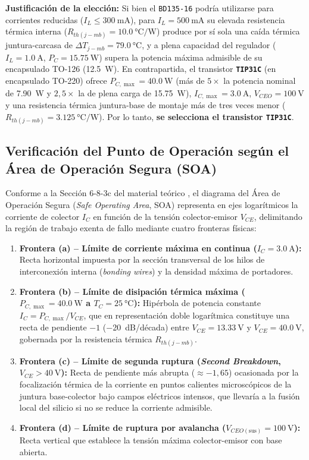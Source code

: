 \textbf{Justificación de la elección:} Si bien el \texttt{BD135-16} podría utilizarse para corrientes reducidas ($I_L \le \SI{300}{\milli\ampere}$), para $I_L = \SI{500}{\milli\ampere}$ su elevada resistencia térmica interna ($R_{th(j-mb)} = \SI{10,0}{\celsius\per\watt}$) produce por sí sola una caída térmica juntura-carcasa de $\Delta T_{j-mb} = \SI{79,0}{\celsius}$, y a plena capacidad del regulador ($I_L = \SI{1,0}{\ampere}$, $P_C = \SI{15,75}{\watt}$) supera la potencia máxima admisible de su encapsulado TO-126 (\SI{12,5}{\watt}). En contrapartida, el transistor \textbf{\texttt{TIP31C}} (en encapsulado TO-220) ofrece $P_{C,\max} = \SI{40,0}{\watt}$ (más de $5\times$ la potencia nominal de \SI{7,90}{\watt} y $2,5\times$ la de plena carga de \SI{15,75}{\watt}), $I_{C,\max} = \SI{3,0}{\ampere}$, $V_{CEO} = \SI{100}{\volt}$ y una resistencia térmica juntura-base de montaje más de tres veces menor ($R_{th(j-mb)} = \SI{3,125}{\celsius\per\watt}$). Por lo tanto, \textbf{se selecciona el transistor \texttt{TIP31C}}.

\subsection{Verificación del Punto de Operación según el Área de Operación Segura (SOA)}
Conforme a la Sección 6-8-3c del material teórico \cite{gonzalez_p2}, el diagrama del Área de Operación Segura (\emph{Safe Operating Area}, SOA) representa en ejes logarítmicos la corriente de colector $I_C$ en función de la tensión colector-emisor $V_{CE}$, delimitando la región de trabajo exenta de fallo mediante cuatro fronteras físicas:
\begin{enumerate}
    \item \textbf{Frontera (a) -- Límite de corriente máxima en continua ($I_C = \SI{3,0}{\ampere}$):} Recta horizontal impuesta por la sección transversal de los hilos de interconexión interna (\emph{bonding wires}) y la densidad máxima de portadores.
    \item \textbf{Frontera (b) -- Límite de disipación térmica máxima ($P_{C,\max} = \SI{40,0}{\watt}$ a $T_C = \SI{25}{\celsius}$):} Hipérbola de potencia constante $I_C = P_{C,\max} / V_{CE}$, que en representación doble logarítmica constituye una recta de pendiente $-1$ (\SI{-20}{\deci\bel}/década) entre $V_{CE} = \SI{13,33}{\volt}$ y $V_{CE} = \SI{40,0}{\volt}$, gobernada por la resistencia térmica $R_{th(j-mb)}$.
    \item \textbf{Frontera (c) -- Límite de segunda ruptura (\emph{Second Breakdown}, $V_{CE} > \SI{40}{\volt}$):} Recta de pendiente más abrupta ($\approx -1,65$) ocasionada por la focalización térmica de la corriente en puntos calientes microscópicos de la juntura base-colector bajo campos eléctricos intensos, que llevaría a la fusión local del silicio si no se reduce la corriente admisible.
    \item \textbf{Frontera (d) -- Límite de ruptura por avalancha ($V_{CEO(\text{sus})} = \SI{100}{\volt}$):} Recta vertical que establece la tensión máxima colector-emisor con base abierta.
\end{enumerate}

